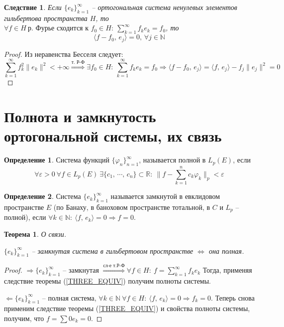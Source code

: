 \documentclass[a4paper,12pt]{article}
\renewcommand{\phi}{\ensuremath{\varphi}}
\theoremstyle{plain}
\newtheorem{theorem}{Теорема}[section]
\newtheorem*{corollary}{Следствие}
\theoremstyle{definition}
\newtheorem{definition}{Определение}[section]
\theoremstyle{remark}
\begin{document}
\begin{corollary}
	Если $\{e_k\}_{k = 1}^\infty$ -- ортогональная система ненулевых элементов гильбертова пространства $H$, то $\forall f \in H\: \text{р. Фурье сходится к }f_0 \in H:\: \sum_{k = 1}^\infty f_ke_k = f_0$, то
	\[\langle f - f_0,\, e_j\rangle = 0,\, \forall j \in \mathbb{N}\]
\end{corollary}

\begin{proof}
	Из неравенства Бесселя следует:
	\[\sum_{k = 1}^\infty f_k^2\|e_k\|^2 < +\infty \stackrel{\text{т. Р-Ф}}{\Rightarrow} \exists f_0 \in H :\: \sum_{k = 1}^\infty f_ke_k = f_0 \Rightarrow \langle f - f_0,\,e_j\rangle = \langle f,\,e_j\rangle - f_j\|e_j\|^2 = 0\]
\end{proof}

\section{Полнота и замкнутость ортогональной системы, их связь}
\begin{definition}
	Система функций $\{\phi_n\}_{n = 1}^\infty$, называется полной в $L_p(E)$, если
	\[\forall \varepsilon > 0 \: \forall f \in L_p(E)\: \exists \{c_1,\,\cdots,\,c_n\} \subset \mathbb{R}:\: \|f - \sum_{k = 1}^n c_k\phi_k\|_p < \varepsilon\]
\end{definition}

\begin{definition}
	Система $\{e_k\}_{k = 1}^\infty$ называется замкнутой в евклидовом пространстве $E$ (по Банаху, в баноховом пространстве тотальной, в $C$ и $L_p$ -- полной), если $\forall k \in \mathbb{N}:\: \langle f,\, e_k\rangle = 0 \Rightarrow f = 0$.
\end{definition}

\begin{theorem}
	О связи.

	$\{e_k\}_{k = 1}^\infty$ -- замкнутая система в гильбертовом пространстве $\Leftrightarrow$ она полная.
\end{theorem}

\begin{proof}
	$\Rightarrow \{e_k\}_{k = 1}^\infty$ -- замкнутая $\stackrel{\text{сл-е т.Р-Ф}}{\Rightarrow} \forall f \in H:\: f = \sum_{k = 1}^\infty f_ke_k$
	Тогда, применяя следствие теоремы (\ref{THREE_EQUIV}) получим полноты системы.

	$\Leftarrow \{e_k\}_{k = 1}^\infty$ -- полная система, $\forall k \in \mathbb{N} \: \forall f \in H:\: \langle f,\,e_k\rangle = 0 \Rightarrow f_k = 0$. Теперь снова применим следствие теоремы (\ref{THREE_EQUIV}) и свойства полноты системы, получим, что $f = \sum 0e_k = 0$.
\end{proof}
\end{document}
